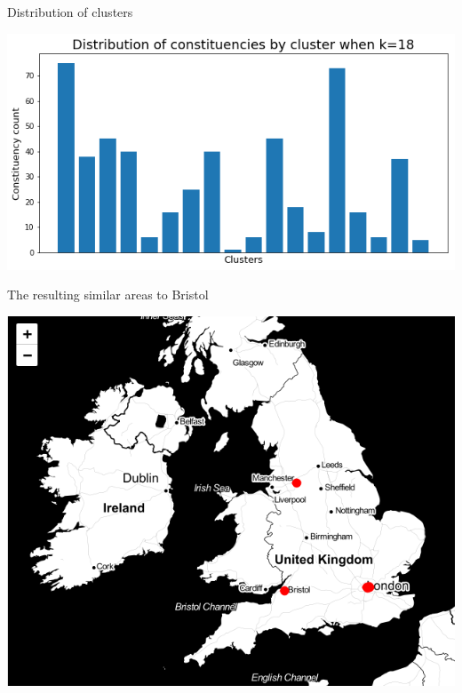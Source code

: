 \documentclass{beamer}
\begin{document}
\begin{frame}{Distribution of clusters}
  \begin{center}
    \includegraphics[scale=.50]{../gfx/cluster_dist1.png}
  \end{center}
\end{frame}


\begin{frame}{The resulting similar areas to Bristol}
  \begin{center}
    \includegraphics[scale=.43]{../gfx/map0.png}
  \end{center}
\end{frame}
\end{document}

